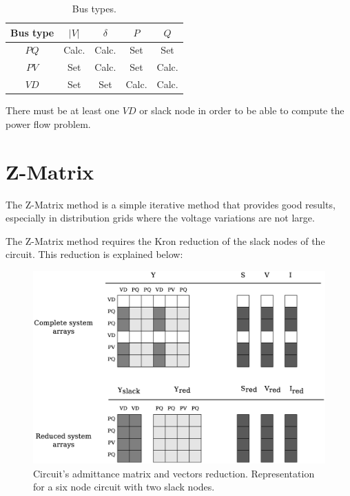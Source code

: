 \documentclass[a4paper,twoside]{tufte-book}
\begin{document}
\begin{table}[h!]
	\begin{center}
		\begin{tabular}{ccccc}
			\toprule
			
			Bus type & $|V|$ &  $\delta$ & $P$ & $Q$\\
			
			\midrule
			
			$PQ$ & Calc. &  Calc. & Set & Set\\
			$PV$ & Set &  Calc. & Set & Calc.\\
			$VD$ & Set &  Set & Calc. & Calc.\\
			
			
			\bottomrule
		\end{tabular}
	\end{center}
	\caption{Bus types.}
	\label{bus__types}
\end{table}

There must be at least one $VD$ or slack node in order to be able to compute the power flow problem. 




\section{Z-Matrix}

The Z-Matrix method is a simple iterative method that provides good results, especially in distribution grids where the voltage variations are not large.

The Z-Matrix method requires the Kron reduction of the slack nodes of the circuit. This reduction is explained below:

\begin{figure}[h!]
  \includegraphics[width=\linewidth]{img/Matrix_reduction.eps}
  \caption{Circuit's admittance matrix and vectors reduction. Representation for a six node circuit with two slack nodes.}
  \label{fig:reduction}
\end{figure}
\end{document}
